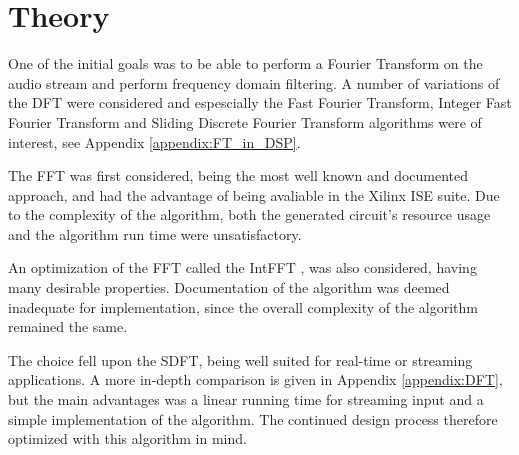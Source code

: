 \section{Theory}

One of the initial goals was to be able to perform a Fourier Transform on the
audio stream and perform frequency domain filtering. A number of variations of
the DFT were considered and espescially the Fast Fourier Transform, Integer Fast
Fourier Transform and Sliding Discrete Fourier Transform algorithms were of
interest, see Appendix \ref{appendix:FT_in_DSP}.

The FFT was first considered, being the most well known and documented approach,
and had the advantage of being avaliable in the Xilinx ISE suite. Due to the
complexity of the algorithm, both the generated circuit's resource usage and the
algorithm run time were unsatisfactory.

An optimization of the FFT called the IntFFT \cite{oraintara}, was also
considered, having many desirable properties. Documentation of the algorithm was
deemed inadequate for implementation, since the overall complexity of the
algorithm remained the same.

The choice fell upon the SDFT\cite{jacobsen03}, being well suited for real-time
or streaming applications. A more in-depth comparison is given in Appendix
\ref{appendix:DFT}, but the main advantages was a linear running time for
streaming input and a simple implementation of the algorithm. The continued
design process therefore optimized with this algorithm in mind.
